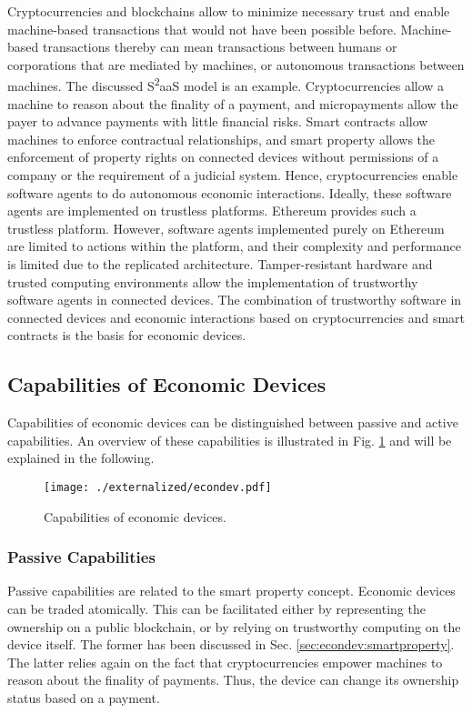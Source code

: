 Cryptocurrencies and blockchains allow to minimize necessary trust and enable machine-based transactions that would not have been possible before. 
Machine-based transactions thereby can mean transactions between humans or corporations that are mediated by machines, or autonomous transactions between machines. The discussed S\textsuperscript{2}aaS model is an example. Cryptocurrencies allow a machine to reason about the finality of a payment, and micropayments allow the payer to advance payments with little financial risks. Smart contracts allow machines to enforce contractual relationships, and smart property allows the enforcement of property rights on connected devices without permissions of a company or the requirement of a judicial system. 
Hence, cryptocurrencies enable software agents to do autonomous economic interactions. Ideally, these software agents are implemented on trustless platforms. Ethereum provides such a trustless platform. However, software agents implemented purely on Ethereum are limited to actions within the platform, and their complexity and performance is limited due to the replicated architecture. Tamper-resistant hardware and trusted computing environments allow the implementation of trustworthy software agents in connected devices. The combination of trustworthy software in connected devices and economic interactions based on cryptocurrencies and smart contracts is the basis for economic devices.

\subsection{Capabilities of Economic Devices}

Capabilities of economic devices can be distinguished between passive and active capabilities. An overview of these capabilities is illustrated in Fig. \ref{fig:econdev} and will be explained in the following.

\begin{figure}
\centering
\texttt{[image: ./externalized/econdev.pdf]}
\caption{Capabilities of economic devices.}
\label{fig:econdev}
\end{figure}

\subsubsection{Passive Capabilities}

Passive capabilities are related to the smart property concept.
Economic devices can be traded atomically. This can be facilitated either by representing the ownership on a public blockchain, or by relying on trustworthy computing on the device itself. The former has been discussed in Sec. \ref{sec:econdev:smartproperty}. The latter relies again on the fact that cryptocurrencies empower machines to reason about the finality of payments. Thus, the device can change its ownership status based on a payment. 


